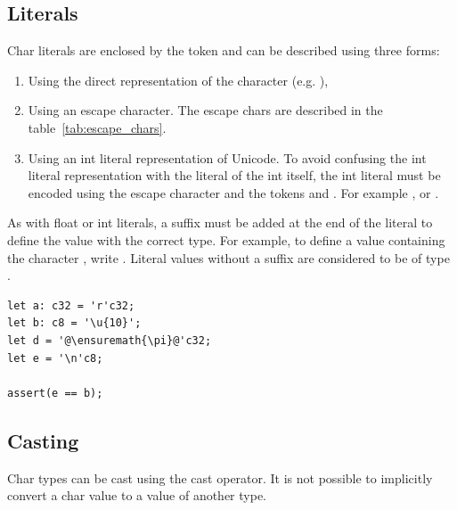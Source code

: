 \subsection{Literals}
\label{sec:org73c4919}

Char literals are enclosed by the token  and can be described using three forms:

\begin{enumerate}
  \setlength\itemsep{-4pt}
\item Using the direct representation of the character (e.g. \tokennolst{\ensuremath{\pi}}),
\item Using an escape character. The escape chars are described in the
  table~\ref{tab:escape_chars}.

\item Using an int literal representation of Unicode. To avoid confusing the int
  literal representation with the literal of the int itself, the int literal
  must be encoded using the escape character  and the
  tokens \token{\{} and \token{\}}. For example
  ,  or
  .

\end{enumerate}

As with float or int literals, a suffix must be added at the end of the literal
to define the value with the correct type. For example, to define a 
value containing the character , write . Literal values
without a suffix are considered to be of type .

\begin{lstlisting}[style=coloredverbatim, escapechar=@]
let a: c32 = 'r'c32;
let b: c8 = '\u{10}';
let d = '@\ensuremath{\pi}@'c32;
let e = '\n'c8;

assert(e == b);
\end{lstlisting}

\subsection{Casting}
\label{sec:org16d703f}

Char types can be cast using the cast operator. It is not possible to implicitly convert a char value to a value of another type.

